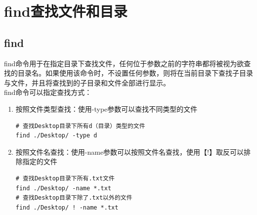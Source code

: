 \documentclass[12pt, openany, oneside]{book}
\begin{document}
\section{find查找文件和目录}

\subsection{find}

find命令用于在指定目录下查找文件，任何位于参数之前的字符串都将被视为欲查找的目录名。如果使用该命令时，不设置任何参数，则将在当前目录下查找子目录与文件，并且将查找到的子目录和文件全部进行显示。 \\

find命令可以指定查找方式：

\begin{enumerate}
	\item 按照文件类型查找：使用-type参数可以查找不同类型的文件
	      \vspace{-0.5cm}
	      \begin{lstlisting}
# 查找Desktop目录下所有d（目录）类型的文件
find ./Desktop/ -type d
\end{lstlisting}

	      \begin{table}[H]
		      \centering
		      \caption{文件类型}
	      \end{table}

	\item 按照文件名查找：使用-name参数可以按照文件名查找，使用【!】取反可以排除指定的文件
	      \vspace{-0.5cm}
	      \begin{lstlisting}
# 查找Desktop目录下所有.txt文件
find ./Desktop/ -name *.txt
# 查找Desktop目录下除了.txt以外的文件
find ./Desktop/ ! -name *.txt
            \end{lstlisting}


\end{enumerate}
\end{document}
